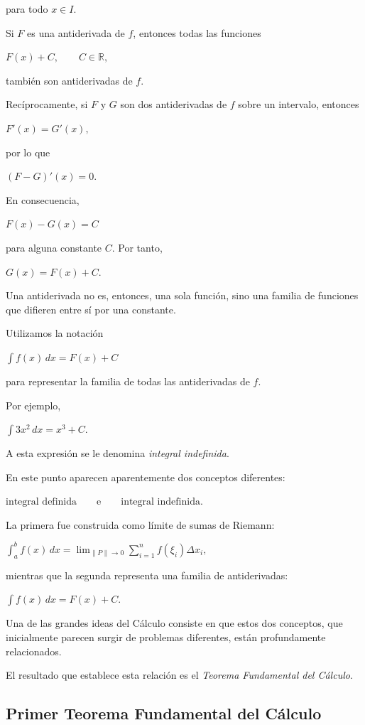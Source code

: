 \documentclass[12pt]{article}
\begin{document}
para todo $x\in I$.

Si $F$ es una antiderivada de $f$, entonces todas las funciones

$
F(x)+C,
\qquad C\in\mathbb{R},
$

también son antiderivadas de $f$.

Recíprocamente, si $F$ y $G$ son dos antiderivadas de $f$ sobre un
intervalo, entonces

$
F'(x)=G'(x),
$

por lo que

$
(F-G)'(x)=0.
$

En consecuencia,

$
F(x)-G(x)=C
$

para alguna constante $C$. Por tanto,

$
\boxed{
G(x)=F(x)+C.
}
$

Una antiderivada no es, entonces, una sola función, sino una familia de
funciones que difieren entre sí por una constante.

Utilizamos la notación

$
\boxed{
\int f(x)\,dx=F(x)+C
}
$

para representar la familia de todas las antiderivadas de $f$.

Por ejemplo,

$
\boxed{
\int 3x^2\,dx=x^3+C.
}
$

A esta expresión se le denomina \emph{integral indefinida}.

En este punto aparecen aparentemente dos conceptos diferentes:

$
\text{integral definida}
\qquad\text{e}\qquad
\text{integral indefinida}.
$

La primera fue construida como límite de sumas de Riemann:

$
\int_a^b f(x)\,dx
=
\lim_{\|P\|\to0}
\sum_{i=1}^{n}f(\xi_i)\Delta x_i,
$

mientras que la segunda representa una familia de antiderivadas:

$
\int f(x)\,dx=F(x)+C.
$

Una de las grandes ideas del Cálculo consiste en que estos dos conceptos,
que inicialmente parecen surgir de problemas diferentes, están
profundamente relacionados.

El resultado que establece esta relación es el
\emph{Teorema Fundamental del Cálculo}.

\subsection*{Primer Teorema Fundamental del Cálculo}
\end{document}
